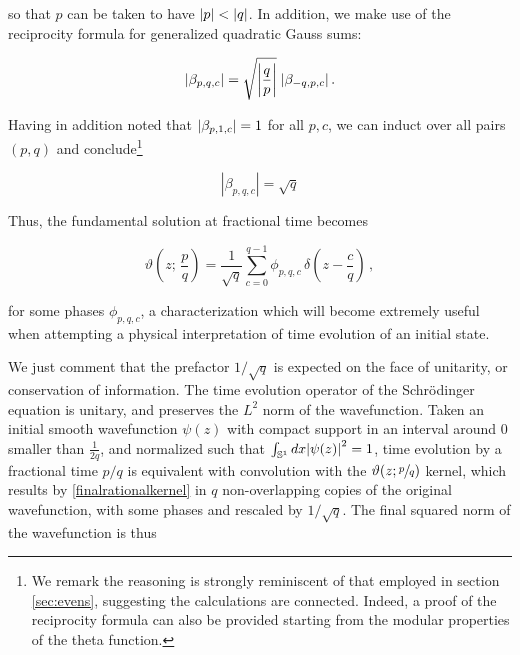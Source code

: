 \documentclass{article}
\newcommand{\cmnt}[1]{\textcolor{red}{\emph{#1}}}
\begin{document}
so that $p$ can be taken to have $\abs{p} < \abs{q}$. In addition, we make use of the reciprocity formula for generalized quadratic Gauss sums\cite{berndt_gauss}:

\begin{equation}
    \abs{\beta_{p,q,c}} = \sqrt{\abs{\frac{q}{p}}} \; \abs{\beta_{-q,p,c}}\,.
\end{equation}

Having in addition noted that $\abs{\beta_{p,1,c}} = 1$ for all $p,c$, we can induct over all pairs $(p,q)$ and conclude\footnote{We remark the reasoning is strongly reminiscent of that employed in section \ref{sec:evens}, suggesting the calculations are connected. Indeed, a proof of the reciprocity formula can also be provided starting from the modular properties of the theta function\cite{berndt_gauss}.}

\begin{equation}
    |\beta_{p,q,c}| = \sqrt{q}
\end{equation}

%
%


Thus, the fundamental solution at fractional time becomes

\begin{equation}\label{finalrationalkernel}
    \vartheta\left( z ; \,\frac{p}{q} \right) = \frac{1}{\sqrt{q}} \sum_{c=0}^{q-1} \phi_{p,q,c} \, \delta \left(z-\frac{c}{q}\right)\,,
\end{equation}

for some phases $\phi_{p,q,c}$, a characterization which will become extremely useful when attempting a physical interpretation of time evolution of an initial state.

We just comment that the prefactor $1/\sqrt{q}$ is expected on the face of unitarity, or conservation of information. The time evolution operator of the Schr\"odinger equation is unitary, and preserves the $L^2$ norm of the wavefunction. Taken an initial smooth wavefunction $\psi(z)$ with compact support in an interval around $0$ smaller than $\frac{1}{2q}$, and normalized such that $\int_{\mathbb{S}^1} dx \abs{\psi(z)}^2 = 1$, time evolution by a fractional time $p/q$ is equivalent with convolution with the $\vartheta(z;\sfrac{p}{q})$ kernel, which results by \eqref{finalrationalkernel} in $q$ non-overlapping copies of the original wavefunction, with some phases and rescaled by $1/\sqrt{q}$. The final squared norm of the wavefunction is thus
\end{document}

